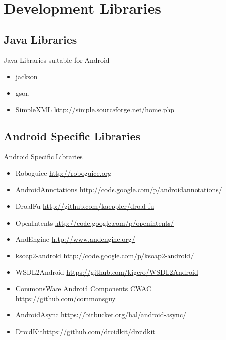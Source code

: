 \documentclass[aspectratio=169]{beamer}
\newcommand{\surl}[1] {{\tiny \url{#1}}}
\begin{document}
\section{Development Libraries}


  \subsection{Java Libraries}

    \begin{frame}{Java Libraries suitable for Android}
      \begin{itemize}
        \item<1->jackson
        \item<2->gson
        \item SimpleXML \surl{http://simple.sourceforge.net/home.php}
      \end{itemize}
    \end{frame}

  \subsection{Android Specific Libraries}

    \begin{frame}{Android Specific Libraries}
      \begin{itemize}
        \item<1->Roboguice \surl{http://roboguice.org} 
        \item<2->AndroidAnnotations \surl{http://code.google.com/p/androidannotations/}
        \item<3->DroidFu \surl{http://github.com/kaeppler/droid-fu}
        \item<4->OpenIntents \surl{http://code.google.com/p/openintents/}
        \item<5->AndEngine \surl{http://www.andengine.org/}
        \item<6->ksoap2-android \surl{http://code.google.com/p/ksoap2-android/}
        \item<7->WSDL2Android \surl{https://github.com/kigero/WSDL2Android}
        \item<8->CommonsWare Android Components CWAC \surl{https://github.com/commonsguy}  
        \item<9->AndroidAsync \surl{https://bitbucket.org/hal/android-async/}  
        \item DroidKit\surl{https://github.com/droidkit/droidkit}
\end{itemize}
    \end{frame}
\end{document}
